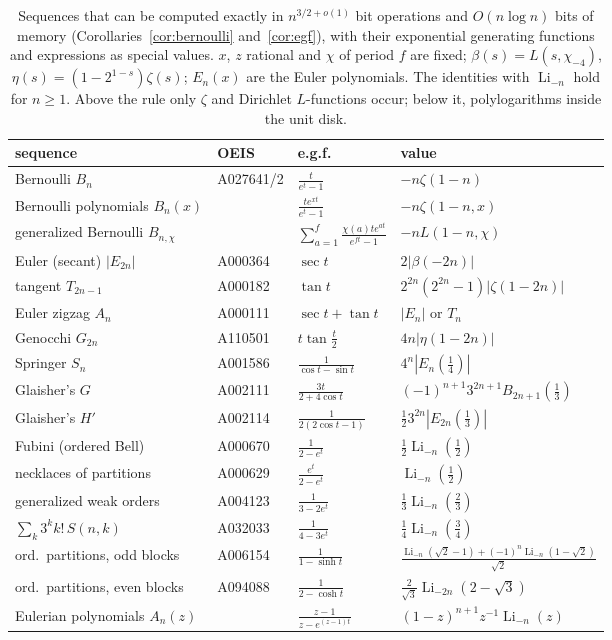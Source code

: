 \documentclass[11pt,reqno]{amsart}
\theoremstyle{definition}
\theoremstyle{remark}
\newcommand{\Li}{\operatorname{Li}}
\begin{document}
\begin{table}[t]
\centering\footnotesize
\renewcommand{\arraystretch}{1.25}\setlength{\tabcolsep}{4pt}
\caption{Sequences that can be computed exactly in $n^{3/2+o(1)}$ bit operations and $O(n\log n)$ bits of memory
(Corollaries~\ref{cor:bernoulli} and~\ref{cor:egf}), with their exponential generating functions and expressions as
special values. $x$, $z$ rational and $\chi$ of period $f$ are fixed; $\beta(s) = L(s,\chi_{-4})$,
$\eta(s) = (1-2^{1-s})\zeta(s)$; $E_n(x)$ are the Euler polynomials. The identities with $\Li_{-n}$ hold for $n \ge 1$.
Above the rule only $\zeta$ and Dirichlet $L$-functions occur; below it, polylogarithms inside the unit
disk.}
\label{tab:sequences}
\begin{tabular}{llll}
\toprule
sequence & OEIS & e.g.f. & value \\
\midrule
Bernoulli $B_n$ & A027641/2 & $\frac{t}{e^t-1}$ & $-n\zeta(1-n)$ \\
Bernoulli polynomials $B_n(x)$ & & $\frac{te^{xt}}{e^t-1}$ & $-n\zeta(1-n,x)$ \\
generalized Bernoulli $B_{n,\chi}$ & & $\sum_{a=1}^{f}\frac{\chi(a)te^{at}}{e^{ft}-1}$ & $-nL(1-n,\chi)$ \\
Euler (secant) $|E_{2n}|$ & A000364 & $\sec t$ & $2|\beta(-2n)|$ \\
tangent $T_{2n-1}$ & A000182 & $\tan t$ & $2^{2n}(2^{2n}-1)|\zeta(1-2n)|$ \\
Euler zigzag $A_n$ & A000111 & $\sec t + \tan t$ & $|E_n|$ or $T_n$ \\
Genocchi $G_{2n}$ & A110501 & $t\tan\frac t2$ & $4n|\eta(1-2n)|$ \\
Springer $S_n$ & A001586 & $\frac1{\cos t - \sin t}$ & $4^n|E_n(\frac14)|$ \\
Glaisher's $G$ & A002111 & $\frac{3t}{2+4\cos t}$ & $(-1)^{n+1}3^{2n+1}B_{2n+1}(\frac13)$ \\
Glaisher's $H'$ & A002114 & $\frac1{2(2\cos t - 1)}$ & $\frac12 3^{2n}|E_{2n}(\frac13)|$ \\
\midrule
Fubini (ordered Bell) & A000670 & $\frac1{2-e^t}$ & $\frac12\Li_{-n}(\frac12)$ \\
necklaces of partitions & A000629 & $\frac{e^t}{2-e^t}$ & $\Li_{-n}(\frac12)$ \\
generalized weak orders & A004123 & $\frac1{3-2e^t}$ & $\frac13\Li_{-n}(\frac23)$ \\
$\sum_k3^kk!\,S(n,k)$ & A032033 & $\frac1{4-3e^t}$ & $\frac14\Li_{-n}(\frac34)$ \\
ord.\ partitions, odd blocks & A006154 & $\frac1{1-\sinh t}$ & $\frac{\Li_{-n}(\sqrt2-1) + (-1)^n\Li_{-n}(1-\sqrt2)}{\sqrt2}$ \\
ord.\ partitions, even blocks & A094088 & $\frac1{2-\cosh t}$ & $\frac2{\sqrt3}\Li_{-2n}(2-\sqrt3)$ \\
Eulerian polynomials $A_n(z)$ & & $\frac{z-1}{z-e^{(z-1)t}}$ & $(1-z)^{n+1}z^{-1}\Li_{-n}(z)$ \\
\bottomrule
\end{tabular}
\end{table}
\end{document}
